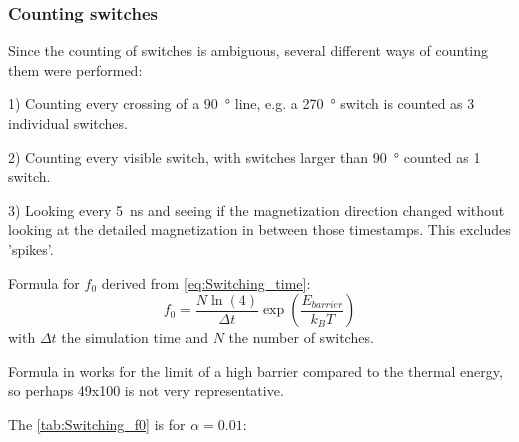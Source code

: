 \documentclass[10pt,a4paper]{article}
\begin{document}
\subsubsection{Counting switches}
Since the counting of switches is ambiguous, several different ways of counting them were performed:

1) Counting every crossing of a \SI{90}{\degree} line, e.g. a \SI{270}{\degree} switch is counted as 3 individual switches.

2) Counting every visible switch, with switches larger than \SI{90}{\degree} counted as 1 switch.

3) Looking every \SI{5}{\nano\second} and seeing if the magnetization direction changed without looking at the detailed magnetization in between those timestamps. This excludes 'spikes'.

Formula for $f_0$ derived from \eqref{eq:Switching_time}:
\begin{equation*}
    f_0 = \frac{N \ln(4)}{\Delta t} \exp(\frac{E_{barrier}}{k_B T})
\end{equation*}
with $\Delta t$ the simulation time and $N$ the number of switches.

Formula in \cite{MuMax3} works for the limit of a high barrier compared to the
thermal energy, so perhaps 49x100 is not very representative.

The \cref{tab:Switching_f0} is for $\alpha=0.01$:
\end{document}
